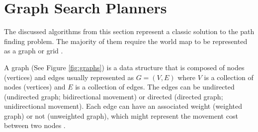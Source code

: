 \section{Graph Search Planners} \label{A. Graph search planners}
The discussed algorithms from this section represent a classic solution to the path finding problem. The majority of them require the world map to be represented as a graph or grid \cite{choset2005principles}.

A graph (See Figure \ref{fig:graphs}) is a data structure that is composed of nodes (vertices) and edges usually represented as $G = (V, E)$ where $V$ is a collection of nodes (vertices) and $E$ is a collection of edges. The edges can be undirected (undirected graph; bidirectional movement) or directed (directed graph; unidirectional movement). Each edge can have an associated weight (weighted graph) or not (unweighted graph), which might represent the movement cost between two nodes \cite{choset2005principles}.

